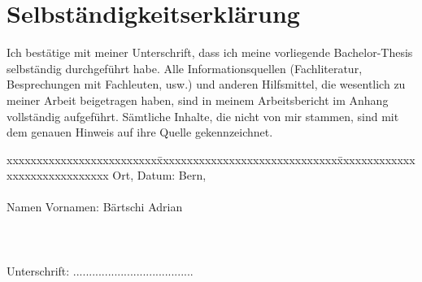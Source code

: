 \chapter*{Selbständigkeitserklärung}
\label{chap:selbstaendigkeitserklaerung}

\vspace*{10mm} 

Ich bestätige mit meiner Unterschrift, dass ich meine vorliegende Bachelor-Thesis selbständig durchgeführt habe. Alle Informationsquellen (Fachliteratur, Besprechungen mit Fachleuten, usw.) und anderen Hilfsmittel, die wesentlich zu meiner Arbeit beigetragen haben, sind in meinem Arbeitsbericht im Anhang vollständig aufgeführt. Sämtliche Inhalte, die nicht von mir stammen, sind mit dem genauen Hinweis auf ihre Quelle gekennzeichnet. 

\vspace{15mm}

\begin{tabbing}
xxxxxxxxxxxxxxxxxxxxxxxxx\=xxxxxxxxxxxxxxxxxxxxxxxxxxxxxx\=xxxxxxxxxxxxxxxxxxxxxxxxxxxxxx\kill
Ort, Datum:		\> Bern, \versiondate \\ \\ 
Namen Vornamen:	\> Bärtschi Adrian 	\\ \\ \\ \\ 
Unterschrift:	\> ......................................\> 
\end{tabbing}